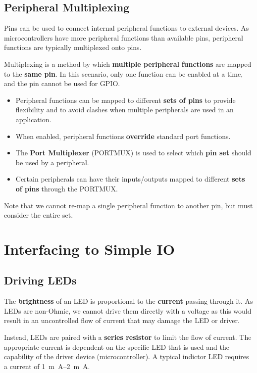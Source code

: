 \documentclass{report}
\begin{document}
\subsection{Peripheral Multiplexing}
Pins can be used to connect internal peripheral functions
to external devices.
As microcontrollers have more peripheral functions than available pins,
peripheral functions are typically multiplexed onto pins.
\begin{definition}[Multiplexing]
    Multiplexing is a method by which \textbf{multiple peripheral} \linebreak \textbf{functions}
    are mapped to the \textbf{same pin}.
    In this scenario, only one function can be enabled at a time, and the pin
    cannot be used for GPIO\@.
\end{definition}
\begin{itemize}
    \item Peripheral functions can be mapped to different \textbf{sets of pins} to provide
          flexibility and to avoid clashes when multiple peripherals are used in
          an application.
    \item When enabled, peripheral functions \textbf{override} standard port functions.
    \item The \textbf{Port Multiplexer} (PORTMUX) is used to select which
          \textbf{pin set} should be used by a peripheral.
    \item Certain peripherals can have their inputs/outputs mapped to different
          \textbf{sets of pins} through the PORTMUX\@.
\end{itemize}
Note that we cannot re-map a single peripheral function to another pin, but must consider the entire set.
\section{Interfacing to Simple IO}
\subsection{Driving LEDs}
The \textbf{brightness} of an LED is proportional to the \textbf{current}
passing through it. As LEDs are non-Ohmic, we cannot drive them directly
with a voltage as this would result in an uncontrolled flow of current that
may damage the LED or driver.

Instead, LEDs are paired with a \textbf{series resistor} to limit the flow of current.
The appropriate current is dependent on the specific LED that is used
and the capability of the driver device (microcontroller).
A typical indictor LED requires a current of \qtyrange{1}{2}{m.A}.
\end{document}
